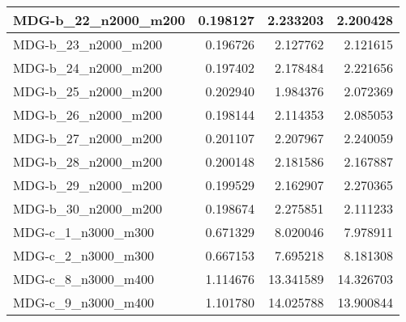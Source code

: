 \documentclass[10pt,a4paper]{article}
\begin{document}
\begin{table}[]
\begin{tabular}{|l|r|r|r|}
		MDG-b\_22\_n2000\_m200              & 0.198127                             & 2.233203                                     & 2.200428                              \\ \hline
		MDG-b\_23\_n2000\_m200              & 0.196726                             & 2.127762                                     & 2.121615                              \\ \hline
		MDG-b\_24\_n2000\_m200              & 0.197402                             & 2.178484                                     & 2.221656                              \\ \hline
		MDG-b\_25\_n2000\_m200              & 0.202940                             & 1.984376                                     & 2.072369                              \\ \hline
		MDG-b\_26\_n2000\_m200              & 0.198144                             & 2.114353                                     & 2.085053                              \\ \hline
		MDG-b\_27\_n2000\_m200              & 0.201107                             & 2.207967                                     & 2.240059                              \\ \hline
		MDG-b\_28\_n2000\_m200              & 0.200148                             & 2.181586                                     & 2.167887                              \\ \hline
		MDG-b\_29\_n2000\_m200              & 0.199529                             & 2.162907                                     & 2.270365                              \\ \hline
		MDG-b\_30\_n2000\_m200              & 0.198674                             & 2.275851                                     & 2.111233                              \\ \hline
		MDG-c\_1\_n3000\_m300               & 0.671329                             & 8.020046                                     & 7.978911                              \\ \hline
		MDG-c\_2\_n3000\_m300               & 0.667153                             & 7.695218                                     & 8.181308                              \\ \hline
		MDG-c\_8\_n3000\_m400               & 1.114676                             & 13.341589                                    & 14.326703                             \\ \hline
		MDG-c\_9\_n3000\_m400               & 1.101780                             & 14.025788                                    & 13.900844                             \\ \hline

\end{tabular}
\end{table}
\end{document}
